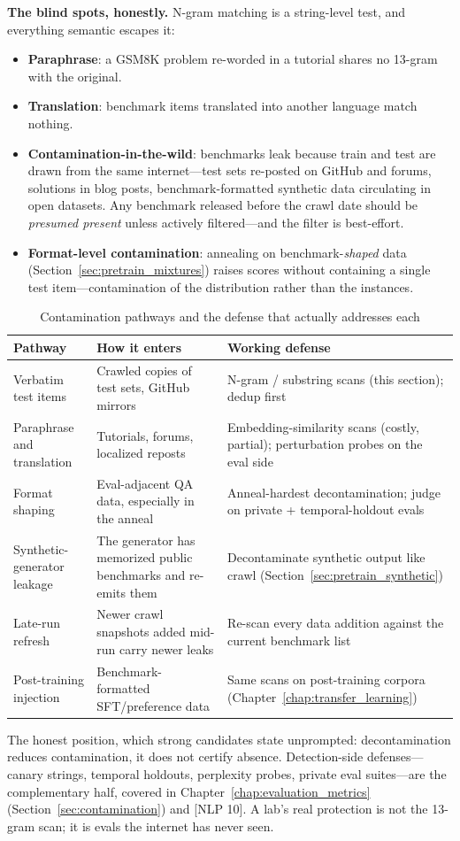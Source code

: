 \textbf{The blind spots, honestly.} N-gram matching is a string-level test, and everything semantic escapes it:
\begin{itemize}
    \item \textbf{Paraphrase}: a GSM8K problem re-worded in a tutorial shares no 13-gram with the original.
    \item \textbf{Translation}: benchmark items translated into another language match nothing.
    \item \textbf{Contamination-in-the-wild}: benchmarks leak because train and test are drawn from the same internet---test sets re-posted on GitHub and forums, solutions in blog posts, benchmark-formatted synthetic data circulating in open datasets. Any benchmark released before the crawl date should be \textit{presumed present} unless actively filtered---and the filter is best-effort.
    \item \textbf{Format-level contamination}: annealing on benchmark-\textit{shaped} data (Section~\ref{sec:pretrain_mixtures}) raises scores without containing a single test item---contamination of the distribution rather than the instances.
\end{itemize}

\begin{table}[H]
\centering
\small
\caption{Contamination pathways and the defense that actually addresses each}
\label{tab:pretrain_contamination}
\begin{tabularx}{\textwidth}{lXX}
\toprule
\textbf{Pathway} & \textbf{How it enters} & \textbf{Working defense} \\
\midrule
Verbatim test items & Crawled copies of test sets, GitHub mirrors & N-gram / substring scans (this section); dedup first \\
Paraphrase and translation & Tutorials, forums, localized reposts & Embedding-similarity scans (costly, partial); perturbation probes on the eval side \\
Format shaping & Eval-adjacent QA data, especially in the anneal & Anneal-hardest decontamination; judge on private + temporal-holdout evals \\
Synthetic-generator leakage & The generator has memorized public benchmarks and re-emits them & Decontaminate synthetic output like crawl (Section~\ref{sec:pretrain_synthetic}) \\
Late-run refresh & Newer crawl snapshots added mid-run carry newer leaks & Re-scan every data addition against the current benchmark list \\
Post-training injection & Benchmark-formatted SFT/preference data & Same scans on post-training corpora (Chapter~\ref{chap:transfer_learning}) \\
\bottomrule
\end{tabularx}
\end{table}
The honest position, which strong candidates state unprompted: decontamination reduces contamination, it does not certify absence. Detection-side defenses---canary strings, temporal holdouts, perplexity probes, private eval suites---are the complementary half, covered in Chapter~\ref{chap:evaluation_metrics} (Section~\ref{sec:contamination}) and [NLP 10]. A lab's real protection is not the 13-gram scan; it is evals the internet has never seen.

